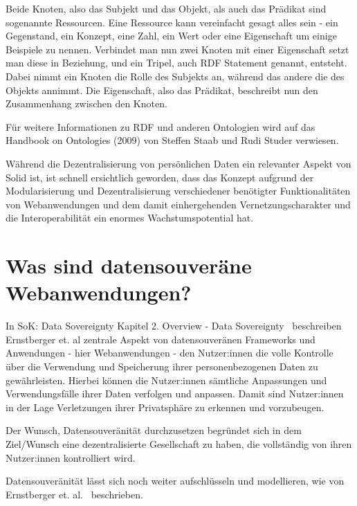 \documentclass[acmtog]{acmart}
\begin{document}
Beide Knoten, also das Subjekt und das Objekt, als auch das Prädikat sind sogenannte Ressourcen. Eine Ressource kann vereinfacht gesagt alles sein - ein Gegenstand, ein Konzept, eine Zahl, ein Wert oder eine Eigenschaft um einige Beispiele zu nennen. Verbindet man nun zwei Knoten mit einer Eigenschaft setzt man diese in Beziehung, und ein Tripel, auch RDF Statement genannt, entsteht. Dabei nimmt ein Knoten die Rolle des Subjekts an, während das andere die des Objekts annimmt. Die Eigenschaft, also das Prädikat, beschreibt nun den Zusammenhang zwischen den Knoten.~\cite{Wood:14:RCA, Bizer2009LinkedD}

Für weitere Informationen zu RDF und anderen Ontologien wird auf das Handbook on Ontologies (2009) von Steffen Staab und Rudi Studer verwiesen.~\cite{staab2009handbook}

Während die Dezentralisierung von persönlichen Daten ein relevanter Aspekt von Solid ist, ist schnell ersichtlich geworden, dass das Konzept aufgrund der Modularisierung und Dezentralisierung verschiedener benötigter Funktionalitäten von Webanwendungen und dem damit einhergehenden Vernetzungscharakter und die Interoperabilität ein enormes Wachstumspotential hat.

\label{section:wasSindDatensouveräneWebanwendungen}
\section{Was sind datensouveräne Webanwendungen?}
In SoK: Data Sovereignty Kapitel 2. Overview - Data Sovereignty~\cite{cryptoeprint:2023/967} beschreiben Ernstberger et. al zentrale Aspekt von datensouveränen Frameworks und Anwendungen - hier Webanwendungen - den Nutzer:innen die volle Kontrolle über die Verwendung und Speicherung ihrer personenbezogenen Daten zu gewährleisten. Hierbei können die Nutzer:innen sämtliche Anpassungen und Verwendungsfälle ihrer Daten verfolgen und anpassen. Damit sind Nutzer:innen in der Lage Verletzungen ihrer Privatsphäre zu erkennen und vorzubeugen.

Der Wunsch, Datensouveränität durchzusetzen begründet sich in dem Ziel/Wunsch eine dezentralisierte Gesellschaft zu haben, die vollständig von ihren Nutzer:innen kontrolliert wird. 

Datensouveränität lässt sich noch weiter aufschlüsseln und modellieren, wie von Ernstberger et. al.~\cite{cryptoeprint:2023/967} beschrieben.

\end{document}
